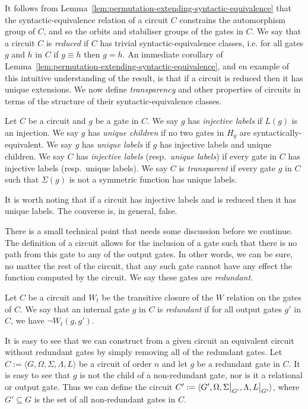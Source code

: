 \documentclass[../paper.tex]{subfiles}
\begin{document}
It follows from Lemma~\ref{lem:permutation-extending-syntactic-equivalence} that
the syntactic-equivalence relation of a circuit $C$ constrains the automorphism
group of $C$, and so the orbits and stabiliser groups of the gates in $C$. We
say that a circuit $C$ is \emph{reduced} if $C$ has trivial
syntactic-equivalence classes, i.e. for all gates $g$ and $h$ in $C$ if $g
\equiv h$ then $g = h$. An immediate corollary of
Lemma~\ref{lem:permutation-extending-syntactic-equivalence}, and en example of
this intuitive understanding of the result, is that if a circuit is reduced then
it has unique extensions. We now define \emph{transparency} and other properties
of circuits in terms of the structure of their syntactic-equivalence classes.

\begin{definition}
  Let $C$ be a circuit and $g$ be a gate in $C$. We say $g$ has \emph{injective
    labels} if $L(g)$ is an injection. We say $g$ has \emph{unique children} if
  no two gates in $H_g$ are syntactically-equivalent. We say $g$ has
  \emph{unique labels} if $g$ has injective labels and unique children. We say
  $C$ has \emph{injective labels} (resp.\ \emph{unique labels}) if every gate in
  $C$ has injective labels (resp.\ unique labels). We say $C$ is
  \emph{transparent} if every gate $g$ in $C$ such that $\Sigma(g)$ is not a
  symmetric function has unique labels.
\end{definition}

It is worth noting that if a circuit has injective labels and is reduced then it
has unique labels. The converse is, in general, false.

There is a small technical point that needs some discussion before we continue.
The definition of a circuit allows for the inclusion of a gate such that there
is no path from this gate to any of the output gates. In other words, we can be
sure, no matter the rest of the circuit, that any such gate cannot have any
effect the function computed by the circuit. We say these gates are
\emph{redundant}.

\begin{definition}
  Let $C$ be a circuit and $W_t$ be the transitive closure of the $W$ relation
  on the gates of $C$. We say that an internal gate $g$ in $C$ is
  \emph{redundant} if for all output gates $g'$ in $C$, we have $\neg W_t (g,
  g')$.
\end{definition}

It is easy to see that we can construct from a given circuit an equivalent
circuit without redundant gates by simply removing all of the redundant gates.
Let $C := \langle G, \Omega, \Sigma, \Lambda, L \rangle$ be a circuit of order
$n$ and let $g$ be a redundant gate in $C$. It is easy to see that $g$ is not
the child of a non-redundant gate, nor is it a relational or output gate. Thus
we can define the circuit $C' := \langle G', \Omega, \restr{\Sigma}{G'},
\Lambda, \restr{L}{G'} \rangle$, where $G' \subseteq G$ is the set of all
non-redundant gates in $C$.
\end{document}
